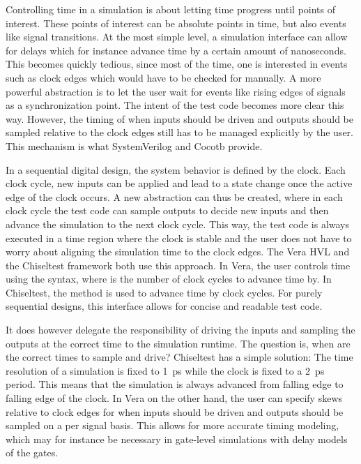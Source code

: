 Controlling time in a simulation is about letting time progress until points of interest. These points of interest can
be absolute points in time, but also events like signal transitions. At the most simple level, a simulation interface
can allow for delays which for instance advance time by a certain amount of nanoseconds. This becomes quickly
tedious, since most of the time, one is interested in events such as clock edges which would have to be checked for
manually. A more powerful abstraction is to let the user wait for events like rising edges of signals as a
synchronization point. The intent of the test code becomes more clear this way. However, the timing of when inputs
should be driven and outputs should be sampled relative to the clock edges still has to be managed explicitly by the user. This mechanism is what SystemVerilog and Cocotb provide.

In a sequential digital design, the system behavior is defined by the clock. Each clock cycle, new inputs can be
applied and lead to a state change once the active edge of the clock occurs. A new abstraction can thus be created,
where in each clock cycle the test code can sample outputs to decide new inputs and then advance the simulation to
the next clock cycle. This way, the test code is always executed in a time region where the clock is stable and the
user does not have to worry about aligning the simulation time to the clock edges. The Vera \cite[Sec. 7]{flake2020a}
HVL and the Chiseltest \cite{chiseltest} framework both use this approach. In Vera, the user controls time using the
 syntax, where  is the number of clock cycles to advance time by. In Chiseltest, the
 method is used to advance time by  clock cycles. For purely sequential designs, this
interface allows for concise and readable test code. 

It does however delegate the responsibility of driving the inputs and sampling the outputs at the correct time to the simulation
runtime. The question is, when are the correct times to sample and
drive? Chiseltest has a simple solution: The time resolution of a simulation is fixed to \SI{1}{ps} while the clock
is fixed to a \SI{2}{ps} period. This means that the simulation is always advanced from falling edge to falling edge
of the clock. In Vera on the other hand, the user can specify skews relative to clock edges for when inputs should be
driven and outputs should be sampled on a per signal basis. This allows for more accurate timing modeling, which may
for instance be necessary in gate-level simulations with delay models of the gates. 

